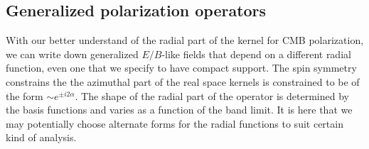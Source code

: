 \subsection{Generalized polarization operators}
With our better understand of the radial part of the kernel for CMB polarization, we can write down generalized $E/B$-like fields that depend on a different radial function, even one that we specify to have compact support.
The spin symmetry constrains the the azimuthal part of the real space kernels is constrained to be of the form $\sim e^{\pm i2 \alpha}$.  The shape of the radial part of the operator is determined by the basis functions and varies as a function of the band limit. It is here that we may potentially choose alternate forms for the radial functions to suit certain kind of analysis.

